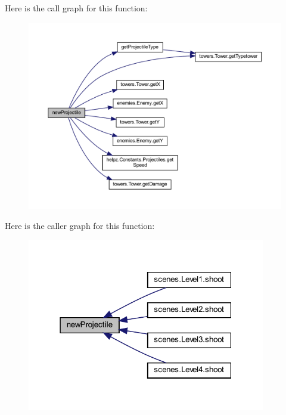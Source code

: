 Here is the call graph for this function\+:\nopagebreak
\begin{figure}[H]
\begin{center}
\leavevmode
\includegraphics[width=350pt]{classmanagers_1_1_projectile_manager_ad4505ed80d64e9561393c0406fe7d904_cgraph}
\end{center}
\end{figure}
Here is the caller graph for this function\+:\nopagebreak
\begin{figure}[H]
\begin{center}
\leavevmode
\includegraphics[width=295pt]{classmanagers_1_1_projectile_manager_ad4505ed80d64e9561393c0406fe7d904_icgraph}
\end{center}
\end{figure}
\mbox{\label{classmanagers_1_1_projectile_manager_ac5c54df7ed3b930268c8d7752c101725}} 
